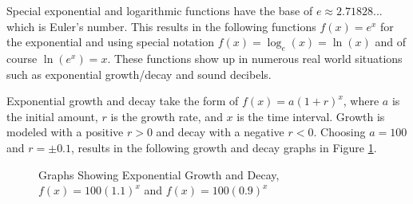 Special exponential and logarithmic functions have the base of $e \approx 2.71828...$ which is Euler's number. This results in the following functions $f(x) = e^x$ for the exponential and using special notation $f(x) = \log_e(x)=\ln(x)$ and of course $\ln(e^x)=x$. These functions show up in numerous real world situations such as exponential growth/decay and sound decibels.

\begin{example}
    Exponential growth and decay take the form of $f(x) = a(1+r)^x$, where $a$ is the initial amount, $r$ is the growth rate, and $x$ is the time interval. Growth is modeled with a positive $r > 0$ and decay with a negative $r < 0$. Choosing $a = 100$ and $r = \pm 0.1$, results in the following growth and decay graphs in Figure \ref{fig:growthdecay}.

    \begin{figure}
        \centering
        \caption{Graphs Showing Exponential Growth and Decay, $f(x)=100(1.1)^x$ and $f(x)=100(0.9)^x$}
        \label{fig:growthdecay}
    \end{figure}
\end{example}

